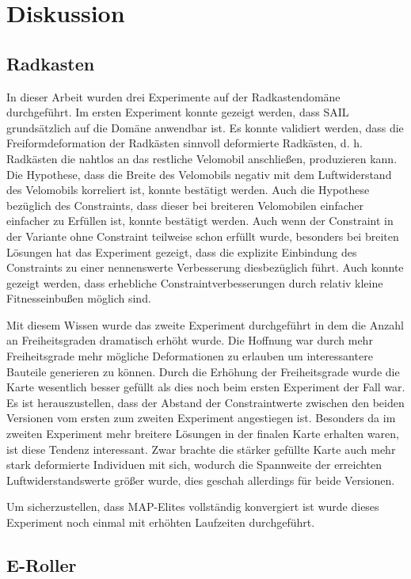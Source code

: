 \section{Diskussion}

\subsection{Radkasten}

In dieser Arbeit wurden drei Experimente auf der Radkastendomäne durchgeführt.
Im ersten Experiment konnte gezeigt werden, dass SAIL grundsätzlich auf die Domäne anwendbar ist.
Es konnte validiert werden, dass die Freiformdeformation der Radkästen sinnvoll deformierte Radkästen, d. h. Radkästen die nahtlos an das restliche Velomobil anschließen, produzieren kann.
Die Hypothese, dass die Breite des Velomobils negativ mit dem Luftwiderstand des Velomobils korreliert ist, konnte bestätigt werden.
Auch die Hypothese bezüglich des Constraints, dass dieser bei breiteren Velomobilen einfacher einfacher zu Erfüllen ist, konnte bestätigt werden.
Auch wenn der Constraint in der Variante ohne Constraint teilweise schon erfüllt wurde, besonders bei breiten Lösungen hat das Experiment gezeigt, dass die explizite Einbindung des Constraints zu einer nennenswerte Verbesserung diesbezüglich führt.
Auch konnte gezeigt werden, dass erhebliche Constraintverbesserungen durch relativ kleine Fitnesseinbußen möglich sind.

Mit diesem Wissen wurde das zweite Experiment durchgeführt in dem die Anzahl an Freiheitsgraden dramatisch erhöht wurde.
Die Hoffnung war durch mehr Freiheitsgrade mehr mögliche Deformationen zu erlauben um interessantere Bauteile generieren zu können.
Durch die Erhöhung der Freiheitsgrade wurde die Karte wesentlich besser gefüllt als dies noch beim ersten Experiment der Fall war.
Es ist herauszustellen, dass der Abstand der Constraintwerte zwischen den beiden Versionen vom ersten zum zweiten Experiment angestiegen ist.
Besonders da im zweiten Experiment mehr breitere Lösungen in der finalen Karte erhalten waren, ist diese Tendenz interessant.
Zwar brachte die stärker gefüllte Karte auch mehr stark deformierte Individuen mit sich, wodurch die Spannweite der erreichten Luftwiderstandswerte größer wurde, dies geschah allerdings für beide Versionen.

Um sicherzustellen, dass MAP-Elites vollständig konvergiert ist wurde dieses Experiment noch einmal mit erhöhten Laufzeiten durchgeführt.


\subsection{E-Roller}

